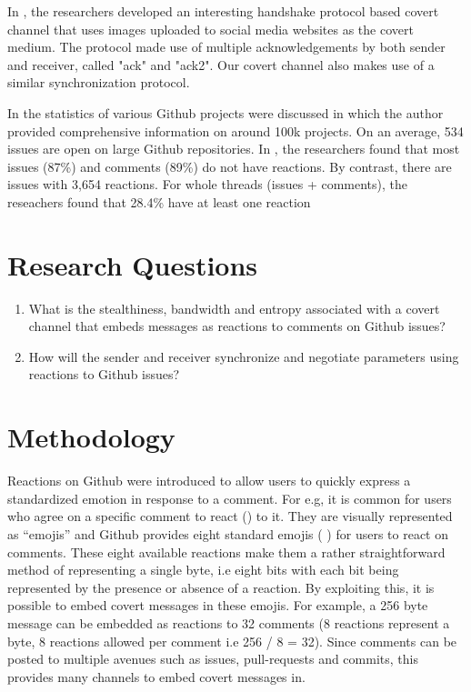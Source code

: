 \documentclass[conference]{IEEEtran}
\begin{document}
In \cite{b6}, the researchers developed an interesting handshake protocol based covert channel that uses images uploaded to social media websites as the covert medium. The protocol made use of multiple acknowledgements by both sender and receiver, called "ack" and "ack2". Our covert channel also makes use of a similar synchronization protocol.

In \cite{b7} the statistics of various Github projects were discussed in which the author provided comprehensive information on around 100k projects. On an average, 534 issues are open on large Github repositories. In \cite{b8}, the researchers found that most issues (87\%) and comments (89\%) do not have reactions. By contrast, there are issues with 3,654 reactions. For whole threads (issues + comments), the reseachers found that 28.4\% have at least one reaction

\section{Research Questions}
\begin{enumerate}
\item What is the stealthiness, bandwidth and entropy associated with a covert channel that embeds messages as reactions to comments on Github issues?
\item How will the sender and receiver synchronize and negotiate parameters using reactions to Github issues?
\end{enumerate}

\section{Methodology}
Reactions on Github were introduced to allow users to quickly express a standardized emotion in response to a comment. For e.g, it is common for users who agree on a specific comment to react () to it. They are visually represented as “emojis” and Github provides eight standard emojis (       ) for users to react on comments. These eight available reactions make them a rather straightforward method of representing a single byte, i.e eight bits with each bit being represented by the presence or absence of a reaction. By exploiting this, it is possible to embed covert messages in these emojis. For example, a 256 byte message can be embedded as reactions to 32 comments (8 reactions represent a byte, 8 reactions allowed per comment i.e 256 / 8 = 32). Since comments can be posted to multiple avenues such as issues, pull-requests and commits, this provides many channels to embed covert messages in. 
\end{document}
